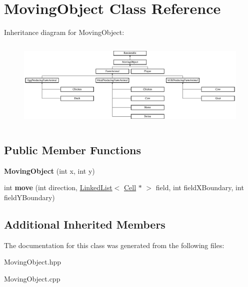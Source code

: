 \hypertarget{class_moving_object}{}\section{Moving\+Object Class Reference}
\label{class_moving_object}
Inheritance diagram for Moving\+Object\+:\begin{figure}[H]
\begin{center}
\leavevmode
\includegraphics[height=4.315992cm]{class_moving_object}
\end{center}
\end{figure}
\subsection*{Public Member Functions}
\begin{DoxyCompactItemize}
\item 
\mbox{\label{class_moving_object_a17d542ade839aeb659b15c9092c87b6b}} 
{\bfseries Moving\+Object} (int x, int y)
\item 
\mbox{\label{class_moving_object_aff2cf6d9e66a88625937ffad5b473267}} 
int {\bfseries move} (int direction, \mbox{\hyperlink{class_linked_list}{Linked\+List}}$<$ \mbox{\hyperlink{class_cell}{Cell}} $\ast$ $>$ field, int field\+X\+Boundary, int field\+Y\+Boundary)
\end{DoxyCompactItemize}
\subsection*{Additional Inherited Members}


The documentation for this class was generated from the following files\+:\begin{DoxyCompactItemize}
\item 
Moving\+Object.\+hpp\item 
Moving\+Object.\+cpp\end{DoxyCompactItemize}
